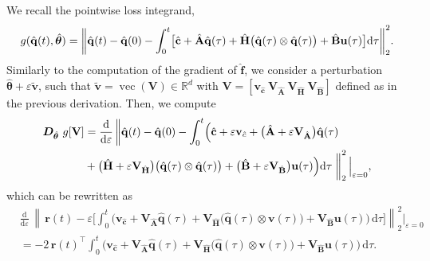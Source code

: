 We recall the pointwise loss integrand,\\
$$g(\hat{\mathbf{q}}(t),\hat{\bm{\theta}}) = \norm{\hat{\mathbf{q}}(t) -\hat{\mathbf{q}}(0) - \int_0^t \bigl[ \hat{\mathbf{c}} + \hat{\mathbf{A}}\hat{\mathbf{q}}(\tau) + \hat{\mathbf{H}}\bigl( \hat{\mathbf{q}}(\tau) \otimes \hat{\mathbf{q}}(\tau) \bigr) + \hat{\mathbf{B}}\mathbf{u}(\tau) \bigr]\dd\tau }_2^2.$$
Similarly to the computation of the gradient of $\hat{\mathbf{f}}$, we consider a perturbation $\hat{\bm{\theta}} + \varepsilon\tilde{\mathbf{v}}$, such that $\tilde{\mathbf{v}}=\operatorname{vec}(\mathbf{V})\in\mathbb{R}^d$ with $\mathbf{V}=[\mathbf{v}_{\hat{\mathbf{c}}}~\mathbf{V}_{\hat{\mathbf{A}}}~\mathbf{V}_{\hat{\mathbf{H}}}~\mathbf{V}_{\hat{\mathbf{B}}}]$ defined as in the previous derivation. Then, we compute\\
\begin{align*}
    \bm{D}_{\hat{\bm{\theta}}}~g[\mathbf{V}] &=\dv{}{\varepsilon}
     \left\| \hat{\mathbf{q}}(t) - \hat{\mathbf{q}}(0) - 
             \int_0^t \Bigl(
                \hat{\mathbf{c}}  + \varepsilon\mathbf{v}_{\hat{c}}
                + \bigl(\hat{\mathbf{A}} + \varepsilon\mathbf{V}_{\hat{\mathbf{A}}}\bigr)\hat{\mathbf{q}}(\tau)
                 \right.  \\
    &
                + \bigl(\hat{\mathbf{H}} + \varepsilon\mathbf{V}_{\hat{\mathbf{H}}}\bigr)
                \bigl(\hat{\mathbf{q}}(\tau) \otimes \hat{\mathbf{q}}(\tau)\bigr)
                + \bigl(\hat{\mathbf{B}} + \varepsilon\mathbf{V}_{\hat{\mathbf{B}}} \bigr)\mathbf{u}(\tau)
            \Bigr) \dd\tau
        \left. \vphantom{\int_0^t}  \right\|_2^2 \Big|_{\varepsilon=0},
\end{align*}
which can be rewritten as\\
\begin{align*}
&\frac{\mathrm{d}}{\mathrm{d}\varepsilon}\,\left\|\,\mathbf{r}(t) - \varepsilon\biggl[ \int_{0}^{t}\bigl(\mathbf{v}_{\hat{\mathbf{c}}} + \mathbf{V}_{\hat{\mathbf{A}}}\hat{\mathbf{q}}(\tau)+\mathbf{V}_{\hat{\mathbf{H}}}\bigl(\hat{\mathbf{q}}(\tau)\otimes\mathbf{v}(\tau)\bigr)+ \mathbf{V}_{\hat{\mathbf{B}}}\mathbf{u}(\tau)\big)\,\mathrm{d}\tau\biggr]\right\|_{2}^{2}\Big|_{\varepsilon=0}\\
&=-2\,\mathbf{r}(t)^{\!\top}\int_{0}^{t}\bigl(\mathbf{v}_{\hat{\mathbf{c}}} + \mathbf{V}_{\hat{\mathbf{A}}}\hat{\mathbf{q}}(\tau)+\mathbf{V}_{\hat{\mathbf{H}}}\bigl(\hat{\mathbf{q}}(\tau)\otimes\mathbf{v}(\tau)\bigr)+ \mathbf{V}_{\hat{\mathbf{B}}}\mathbf{u}(\tau)\big)\,\mathrm{d}\tau.
\end{align*}

